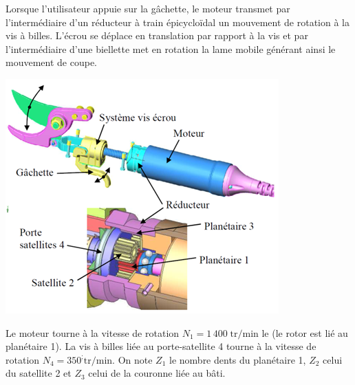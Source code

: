 \documentclass[10pt,oneside]{article}
\begin{document}
\begin{minipage}[c]{.55\linewidth}
Lorsque l’utilisateur appuie sur la gâchette, le moteur transmet par l’intermédiaire d’un réducteur à train épicycloïdal un mouvement de rotation à la vis à billes. L’écrou se déplace en translation par rapport à la vis et par l’intermédiaire d’une biellette met en rotation la lame mobile générant ainsi le mouvement de coupe. 
\end{minipage} \hfill
\begin{minipage}[c]{.4\linewidth}
\begin{center}
 \includegraphics[width=.95\textwidth]{png/secateur2}
\end{center}
\end{minipage} 


\vspace{.25cm}

Le moteur tourne à la vitesse de rotation $N_1=1\,400\;\text{tr/min}$ le (le rotor est lié au planétaire 1). La vis à billes liée au porte-satellite 4 tourne à la vitesse de rotation $N_4=350^; \text{tr/min}$. On note $Z_1$ le nombre dents du planétaire 1, $Z_2$ celui du satellite 2 et $Z_3$ celui de la couronne liée au bâti.

\vspace{.25cm}
\end{document}
